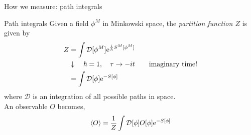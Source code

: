 \documentclass[10pt,show notes on second screen]{beamer}
\begin{document}
\begin{frame}{How we measure: path integrals}
\end{frame}

\begin{frame}{Path integrals}
Given a field $\phi^M$ in Minkowski space, the \textit{partition function $Z$} is given by
\begin{align*}
    Z &= \int \mathcal{D}[\phi^M] \mathrm{e}^{\frac{i}{\hbar}S^M[\phi^M]} \\
    &\downarrow \quad \hbar=1, \quad \tau \rightarrow -it \qquad \text{imaginary time!} \\
    &= \int \mathcal{D}[\phi] \mathrm{e}^{-S[\phi]}
\end{align*}
where $\mathcal{D}$ is an integration of all possible paths in space.
\\
An observable $O$ becomes,
\begin{align*}
    \left\langle{O}\right\rangle = \frac{1}{Z} \int\mathcal{D}[\phi] O[\phi] \mathrm{e}^{-S[\phi]}
\end{align*}
\end{frame}
\end{document}
